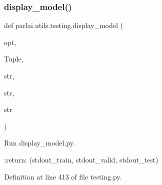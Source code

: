 \subsubsection{\texorpdfstring{display\+\_\+model()}{display\_model()}}
{\footnotesize\ttfamily def parlai.\+utils.\+testing.\+display\+\_\+model (\begin{DoxyParamCaption}\item[{}]{opt,  }\item[{}]{Tuple,  }\item[{}]{str,  }\item[{}]{str,  }\item[{}]{str }\end{DoxyParamCaption})}

\begin{DoxyVerb}Run display_model.py.

:return: (stdout_train, stdout_valid, stdout_test)
\end{DoxyVerb}
 

Definition at line 413 of file testing.\+py.



